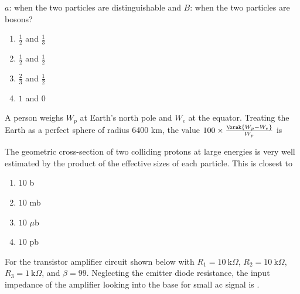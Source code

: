 $a$: when the two particles are distinguishable and $B$: when the two particles are bosons?  

\begin{enumerate}
    \item  $\frac{1}{2}$ and  $\frac{1}{3}$
    \item  $\frac{1}{2}$ and $\frac{1}{2}$
\item  $\frac{2}{3}$ and  $\frac{1}{2}$
    \item  $1$ and  $0$
\end{enumerate}

\item A person weighs $W_p$ at Earth's north pole and $W_e$ at the equator. Treating the Earth as a perfect sphere of radius 6400 km, the value $100 \times \frac{\brak{W_p - W_e}}{W_p}$ is 

\item The geometric cross-section of two colliding protons at large energies is very well estimated by the product of the effective sizes of each particle. This is closest  
 to

\begin{enumerate}
    \item $10$ b
    \item $10$ mb
    \item $10$ $\mu$b
    \item $10$ pb
\end{enumerate}

\item For the transistor amplifier circuit shown below with $R_1 = 10~\text{k}\Omega$, $R_2 = 10~\text{k}\Omega$, $R_3 = 1~\text{k}\Omega$, and $\beta = 99$. Neglecting the emitter diode resistance, the input impedance of the amplifier looking into the base for small ac  
 signal is . 

 \begin{figure}[!ht]
\centering
{}%

\label{fig:my_label}
\end{figure}


